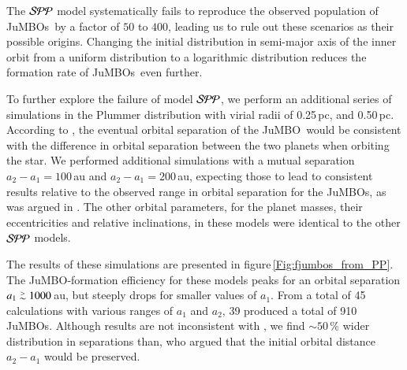 \documentclass[submission,phys]{lib/SciPost}
\def\apgt{\ {\raise-.5ex\hbox{$\buildrel>\over\sim$}}\ }
\newcommand{\jumbo}{\mbox{JuMBO}}
\newcommand{\jumbos}{\mbox{JuMBOs}}
\begin{document}
The ${\cal SPP}$ model systematically fails to reproduce the observed
population of \jumbos\, by a factor of $50$ to $400$, leading us to rule out
these scenarios as their possible origins. Changing the initial
distribution in semi-major axis of the inner orbit from a uniform
distribution to a logarithmic distribution reduces the formation rate
of \jumbos\, even further.

To further explore the failure of model ${\cal SPP}$, we perform an
additional series of simulations in the Plummer distribution with
virial radii of 0.25\,pc, and 0.50\,pc.  According to
\cite{2023arXiv231006016W}, the eventual orbital separation of the
\jumbo\, would be consistent with the difference in orbital separation
between the two planets when orbiting the star.  We performed
additional simulations with a mutual separation $a_2-a_1 = 100$\,au and
$a_2-a_1 = 200$\,au, expecting those to lead to consistent results relative to
the observed range in orbital separation for the
\jumbos, as was argued in \cite{2023arXiv231006016W}.  The other
orbital parameters, for the planet masses, their eccentricities and
relative inclinations, in these models were identical to the other
${\cal SPP}$ models.

The results of these simulations are presented in
figure\,\ref{Fig:fjumbos_from_PP}.  The \jumbo-formation efficiency
for these models peaks for an orbital separation $a_1 \apgt 1000$\,au,
but steeply drops for smaller values of $a_1$.  From a total of 45
calculations with various ranges of $a_1$ and $a_2$, 39 produced a
total of 910 \jumbos.  Although results are not inconsistent with
\cite{2023arXiv231006016W}, we find $\sim 50$\,\% wider distribution
in separations than\cite{2023arXiv231006016W}, who argued that the
initial orbital distance $a_2-a_1$ would be preserved.
\end{document}
